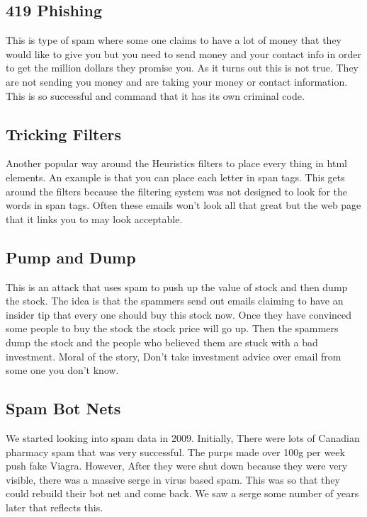 \documentclass[letterpaper, onecolumn,10pt]{IEEEtran}
\begin{document}
		    \subsection{419 Phishing}
		    This is type of spam where some one claims to have a lot of money that they would like to give you but you need to send money and your contact info in order to get the million dollars they promise you. As it turns out this is not true. They are not sending you money and are taking your money or contact information. This is so successful and command that it has its own criminal code.\\
		    
		    \subsection{Tricking Filters}
		    Another popular way around the Heuristics filters to place every thing in html elements. An example is that you can place each letter in span tags. This gets around the filters because the filtering system was not designed to look for the words in span tags. Often these emails won't look all that great but the web page that it links you to may look acceptable.\\
		    
		    \subsection{Pump and Dump}
		    This is an attack that uses spam to push up the value of stock and then dump the stock. The idea is that the spammers send out emails claiming to have an insider tip that every one should buy this stock now. Once they have convinced some people to buy the stock the stock price will go up. Then the spammers dump the stock and the people who believed them are stuck with a bad investment. Moral of the story, Don't take investment advice over email from some one you don't know.\\
		    
		    \subsection{Spam Bot Nets}
		    We started looking into spam data in 2009. Initially, There were lots of Canadian pharmacy spam that was very successful. The purps made over 100g per week push fake Viagra. However, After they were shut down because they were very visible, there was a massive serge in virus based spam. This was so that they could rebuild their bot net and come back. We saw a serge some number of years later that reflects this.\\
		    
\end{document}
